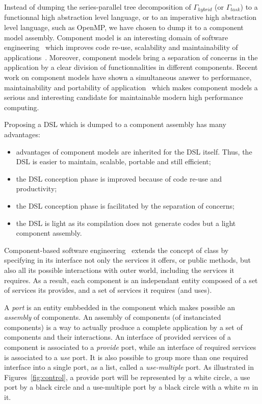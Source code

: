 Instead of dumping the series-parallel tree decomposition of $\Gamma_{hybrid}$ (or $\Gamma_{task}$) to a functionnal high abstraction level language, or to an imperative high abstraction level language, such as OpenMP, we have chosen to dump it to a component model assembly. Component model is an interesting domain of software engineering~\cite{Szyperski:2002:CSB:515228} which improves code re-use, scalability and maintainability of applications~\cite{Szyperski:2002:CSB:515228,bigot:inria-00388508}. Moreover, component models bring a separation of concerns in the application by a clear division of functionnalities in different components.
Recent work on component models have shown a simultaneous answer to performance, maintainability and portability of application~\cite{l2c} which makes component models a serious and interesting candidate for maintainable modern high performance computing. 

Proposing a DSL which is dumped to a component assembly has many advantages:
\begin{itemize}
\item advantages of component models are inherited for the DSL itself. Thus, the DSL is easier to maintain, scalable, portable and still efficient; %
\item the DSL conception phase is improved because of code re-use and productivity; %
\item the DSL conception phase is facilitated by the separation of concerns; %
\item the DSL is light as its compilation does not generate codes but a light component assembly. %
\end{itemize}

Component-based software engineering~\cite{Szyperski:2002:CSB:515228} extends the concept of class by specifying in its interface not only the services it offers, or public methods, but also all its possible interactions with outer world, including the services it requires. As a result, each component is an independant entity composed of a set of services its provides, and a set of services it requires (and uses). 

A \emph{port} is an entity embbedded in the component which makes possible an \emph{assembly} of components. An assembly of components (of instanciated components) is a way to actually produce a complete application by a set of components and their interactions. An interface of provided services of a component is associated to a \emph{provide} port, while an interface of required services is associated to a \emph{use} port. It is also possible to group more than one required interface into a single port, as a list, called a \emph{use-multiple} port. As illustrated in Figures~\ref{fig:control}, a provide port will be represented by a white circle, a use port by a black circle and a use-multiple port by a black circle with a white $m$ in it.


